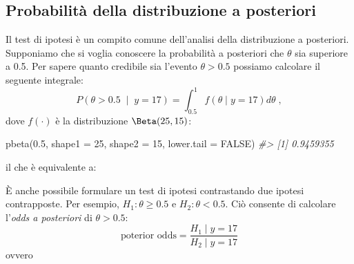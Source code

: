 \documentclass[
  11pt,
  italian,
  a4paper,
  extrafontsizes,onecolumn,openright
  ]{memoir}
\newenvironment{Shaded}{\begin{snugshade}}{\end{snugshade}}
\newcommand{\AttributeTok}[1]{\textcolor[rgb]{0.77,0.63,0.00}{#1}}
\newcommand{\CommentTok}[1]{\textcolor[rgb]{0.56,0.35,0.01}{\textit{#1}}}
\newcommand{\ConstantTok}[1]{\textcolor[rgb]{0.00,0.00,0.00}{#1}}
\newcommand{\ControlFlowTok}[1]{\textcolor[rgb]{0.13,0.29,0.53}{\textbf{#1}}}
\newcommand{\DecValTok}[1]{\textcolor[rgb]{0.00,0.00,0.81}{#1}}
\newcommand{\FloatTok}[1]{\textcolor[rgb]{0.00,0.00,0.81}{#1}}
\newcommand{\FunctionTok}[1]{\textcolor[rgb]{0.00,0.00,0.00}{#1}}
\newcommand{\NormalTok}[1]{#1}
\newcommand{\OtherTok}[1]{\textcolor[rgb]{0.56,0.35,0.01}{#1}}
\newcommand{\SpecialCharTok}[1]{\textcolor[rgb]{0.00,0.00,0.00}{#1}}
\begin{document}
\hypertarget{probabilituxe0-della-distribuzione-a-posteriori}{%
\subsection{Probabilità della distribuzione a posteriori}\label{probabilituxe0-della-distribuzione-a-posteriori}}

Il test di ipotesi è un compito comune dell'analisi della distribuzione a posteriori. Supponiamo che si voglia conoscere la probabilità a posteriori che \(\theta\) sia superiore a 0.5. Per sapere quanto credibile sia l'evento \(\theta > 0.5\) possiamo calcolare il seguente integrale:
\[
P(\theta > 0.5 \; \mid \; y = 17) = \int_{0.5}^{1}f(\theta \mid y=17)d\theta \;,
\]
dove \(f(\cdot)\) è la distribuzione \(\mbox{\Beta}(25, 15)\):

\begin{Shaded}
\begin{Highlighting}[]
\FunctionTok{pbeta}\NormalTok{(}\FloatTok{0.5}\NormalTok{, }\AttributeTok{shape1 =} \DecValTok{25}\NormalTok{, }\AttributeTok{shape2 =} \DecValTok{15}\NormalTok{, }\AttributeTok{lower.tail =} \ConstantTok{FALSE}\NormalTok{)}
\CommentTok{\#\textgreater{} [1] 0.9459355}
\end{Highlighting}
\end{Shaded}

\noindent
il che è equivalente a:

\begin{Shaded}
\end{Shaded}

È anche possibile formulare un test di ipotesi contrastando due ipotesi contrapposte. Per esempio, \(H_1: \theta \geq 0.5\) e \(H_2: \theta < 0.5\). Ciò consente di calcolare l'\emph{odds a posteriori} di \(\theta > 0.5\):
\begin{equation}
\text{poterior odds} = \frac{H_1 \mid y = 17}{H_2 \mid y = 17}
\end{equation}
ovvero
\end{document}
